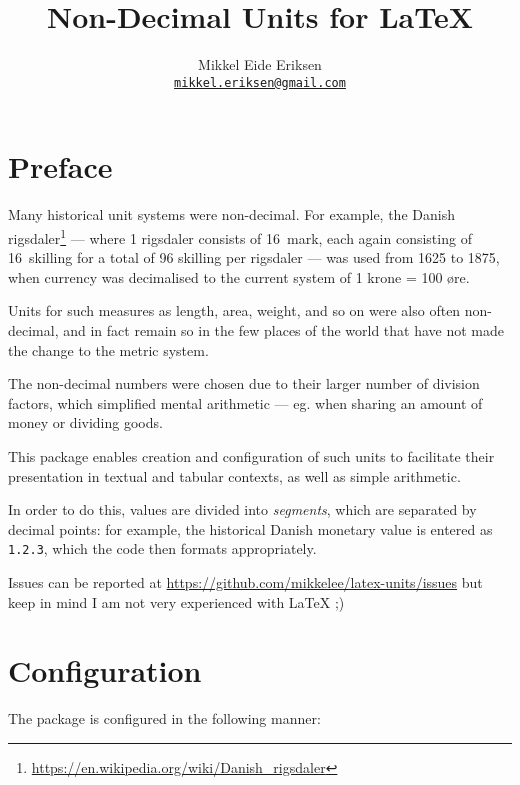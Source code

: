 \documentclass[
	a4paper,
	margin=4cm
]{article}
\title{Non-Decimal Units for \LaTeX}
\author{Mikkel Eide Eriksen\\\href{mailto:mikkel.eriksen@gmail.com}{\texttt{mikkel.eriksen@gmail.com}}}
\begin{document}
\maketitle

\section{Preface} %

Many historical unit systems were non-decimal. For example, the Danish rigsdaler\footnote{\url{https://en.wikipedia.org/wiki/Danish_rigsdaler}} --- where 1 rigsdaler consists of 16~mark, each again consisting of 16~skilling for a total of 96 skilling per rigsdaler --- was used from 1625 to 1875, when currency was decimalised to the current system of 1 krone = 100 øre.


Units for such measures as length, area, weight, and so on were also often non-decimal, and in fact remain so in the few places of the world that have not made the change to the metric system.

The non-decimal numbers were chosen due to their larger number of division factors, which simplified mental arithmetic --- eg. when sharing an amount of money or dividing goods.

This package enables creation and configuration of such units to facilitate their presentation in textual and tabular contexts, as well as simple arithmetic.

In order to do this, values are divided into \emph{segments}, which are separated by decimal points: for example, the historical Danish monetary value  is entered as \texttt{1.2.3}, which the code then formats appropriately.

Issues can be reported at \url{https://github.com/mikkelee/latex-units/issues} but keep in mind I am not very experienced with \LaTeX{} ;)

\clearpage
\section{Configuration} %

The package is configured in the following manner:
\end{document}
